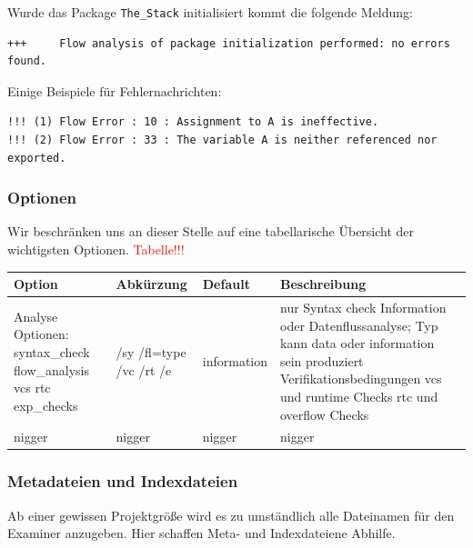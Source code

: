 Wurde das Package \texttt{The\_Stack} initialisiert kommt die folgende Meldung:

\begin{verbatim}
+++		Flow analysis of package initialization performed: no errors found.
\end{verbatim}

Einige Beispiele für Fehlernachrichten:
\begin{verbatim}
!!! (1)	Flow Error : 10 : Assignment to A is ineffective.
!!! (2) Flow Error : 33 : The variable A is neither referenced nor exported.
\end{verbatim}

\subsubsection{Optionen}
Wir beschränken uns an dieser Stelle auf eine tabellarische Übersicht der wichtigsten Optionen.
\textcolor{red}{Tabelle!!!}

\begin{footnotesize}
\begin{tabular}{|p{30mm}|p{30mm}|p{30mm}|p{30mm}|}
\hline 
Option & Abkürzung & Default & Beschreibung \\ 
\hline 
Analyse Optionen: \newline syntax\_check \newline flow\_analysis \newline vcs \newline rtc \newline exp\_checks & /sy \newline /fl=type \newline /vc \newline /rt \newline /e & information & nur Syntax check \newline Information oder Datenflussanalyse; Typ kann data oder information sein \newline produziert Verifikationsbedingungen \newline vcs und runtime Checks \newline rtc und overflow Checks \\ 
\hline 
nigger & nigger & nigger & nigger \\ 
\hline 
\end{tabular} 
\end{footnotesize}

\subsubsection{Metadateien und Indexdateien}
Ab einer gewissen Projektgröße wird es zu umständlich alle Dateinamen für den Examiner anzugeben. Hier schaffen Meta- und Indexdateiene Abhilfe.

